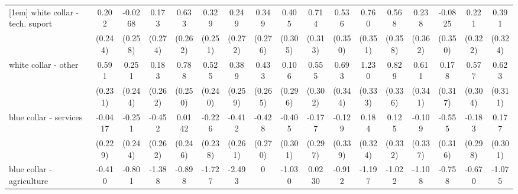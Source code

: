 {\begin{tabular}{l*{16}{c}}
[1em]
white collar - tech. suport&       0.202         &     -0.0268         &       0.173         &       0.633\sym{*}  &       0.329         &       0.249         &       0.349         &       0.405         &       0.714\sym{*}  &       0.536         &       0.760\sym{*}  &       0.568         &       0.238         &     -0.0825         &       0.221         &       0.391         \\
                    &     (0.244)         &     (0.258)         &     (0.274)         &     (0.262)         &     (0.251)         &     (0.272)         &     (0.276)         &     (0.305)         &     (0.313)         &     (0.350)         &     (0.351)         &     (0.358)         &     (0.362)         &     (0.350)         &     (0.322)         &     (0.324)         \\
[1em]
white collar - other&       0.591\sym{*}  &       0.251         &       0.183         &       0.788\sym{**} &       0.525\sym{*}  &       0.389         &       0.433         &       0.106         &       0.555         &       0.693\sym{*}  &       1.230\sym{***}&       0.829\sym{*}  &       0.611         &       0.178         &       0.577         &       0.623\sym{*}  \\
                    &     (0.231)         &     (0.244)         &     (0.262)         &     (0.250)         &     (0.240)         &     (0.259)         &     (0.265)         &     (0.296)         &     (0.302)         &     (0.344)         &     (0.333)         &     (0.336)         &     (0.341)         &     (0.317)         &     (0.304)         &     (0.311)         \\
[1em]
blue collar - services&     -0.0417         &      -0.251         &      -0.452         &      0.0142         &      -0.226         &      -0.412         &      -0.428         &      -0.405         &      -0.177         &      -0.129         &       0.184         &       0.125         &      -0.109         &      -0.555         &      -0.183         &       0.177         \\
                    &     (0.229)         &     (0.244)         &     (0.262)         &     (0.246)         &     (0.238)         &     (0.261)         &     (0.270)         &     (0.301)         &     (0.297)         &     (0.339)         &     (0.324)         &     (0.332)         &     (0.337)         &     (0.316)         &     (0.298)         &     (0.301)         \\
[1em]
blue collar - agriculture&      -0.410         &      -0.801         &      -1.388\sym{*}  &      -0.898         &      -1.727\sym{*}  &      -2.493\sym{*}  &           0         &      -1.030         &      0.0230         &      -0.912         &      -1.197         &      -1.022         &      -1.108         &      -0.758         &      -0.670         &      -1.075         \\

\end{tabular}}

